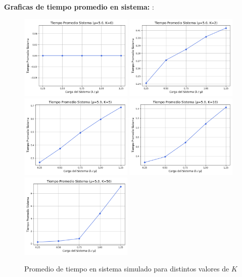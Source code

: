 \documentclass[12pt]{article}
\begin{document}
\textbf{Graficas de tiempo promedio en sistema: }:
\begin{figure}[H]
    \centering

\includegraphics[width=0.48\textwidth]{graficas/mm1k/k_0/tiempo_promedio_sistema.png}
\includegraphics[width=0.48\textwidth]{graficas/mm1k/k_2/tiempo_promedio_sistema.png}
\includegraphics[width=0.48\textwidth]{graficas/mm1k/k_5/tiempo_promedio_sistema.png}
\includegraphics[width=0.48\textwidth]{graficas/mm1k/k_10/tiempo_promedio_sistema.png}
\includegraphics[width=0.48\textwidth]{graficas/mm1k/k_50/tiempo_promedio_sistema.png}
\caption{Promedio de tiempo en sistema simulado para distintos valores de \( K \)}
\end{figure}
\end{document}
